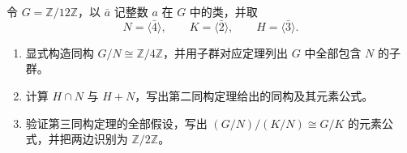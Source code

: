 \begin{exercise}\label{b1:ex:02-quotient-correspondence-calculation}
	令 \(G=\mathbb Z/12\mathbb Z\)，以 \(\bar a\) 记整数 \(a\) 在 \(G\) 中的类，并取
	\[
		N=\langle\bar4\rangle,\qquad K=\langle\bar2\rangle,\qquad H=\langle\bar3\rangle.
	\]
	\begin{enumerate}
		\item 显式构造同构 \(G/N\cong\mathbb Z/4\mathbb Z\)，并用子群对应定理列出 \(G\) 中全部包含 \(N\) 的子群。
		\item 计算 \(H\cap N\) 与 \(H+N\)，写出第二同构定理给出的同构及其元素公式。
		\item 验证第三同构定理的全部假设，写出 \((G/N)/(K/N)\cong G/K\) 的元素公式，并把两边识别为 \(\mathbb Z/2\mathbb Z\)。
	\end{enumerate}

\end{exercise}
